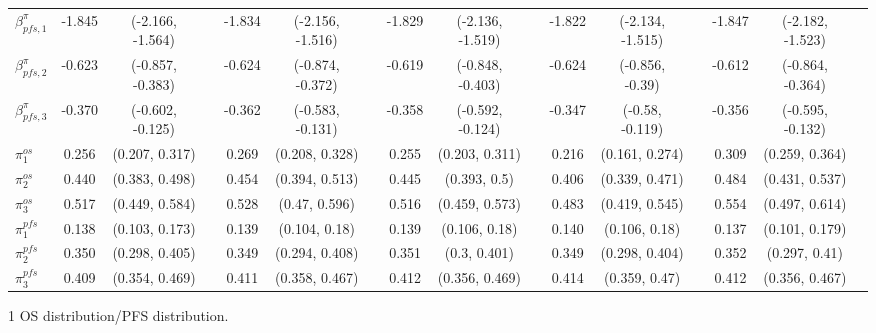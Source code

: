 \documentclass[AMA,STIX1COL]{WileyNJD-v2}
\begin{document}
\begin{landscape}
\begin{center}
\begin{table}[t]
\begin{tabular}{l c c c c c c c c c c c c c c c}
$\beta^{\pi}_{pfs, 1}$ & -1.845 & (-2.166, -1.564) &  & -1.834 & (-2.156, -1.516) &  & -1.829 & (-2.136, -1.519) &  & -1.822 & (-2.134, -1.515) &  & -1.847 & (-2.182, -1.523) & \\
$\beta^{\pi}_{pfs, 2}$ & -0.623 & (-0.857, -0.383) &  & -0.624 & (-0.874, -0.372) &  & -0.619 & (-0.848, -0.403) &  & -0.624 & (-0.856, -0.39) &  & -0.612 & (-0.864, -0.364) & \\
$\beta^{\pi}_{pfs, 3}$ & -0.370 & (-0.602, -0.125) &  & -0.362 & (-0.583, -0.131) &  & -0.358 & (-0.592, -0.124) &  & -0.347 & (-0.58, -0.119) &  & -0.356 & (-0.595, -0.132) & \\
$\pi^{os}_1$ & 0.256 & (0.207, 0.317) &  & 0.269 & (0.208, 0.328) &  & 0.255 & (0.203, 0.311) &  & 0.216 & (0.161, 0.274) &  & 0.309 & (0.259, 0.364) & \\
$\pi^{os}_2$ & 0.440 & (0.383, 0.498) &  & 0.454 & (0.394, 0.513) &  & 0.445 & (0.393, 0.5) &  & 0.406 & (0.339, 0.471) &  & 0.484 & (0.431, 0.537) & \\
$\pi^{os}_3$ & 0.517 & (0.449, 0.584) &  & 0.528 & (0.47, 0.596) &  & 0.516 & (0.459, 0.573) &  & 0.483 & (0.419, 0.545) &  & 0.554 & (0.497, 0.614) & \\
$\pi^{pfs}_1$ & 0.138 & (0.103, 0.173) &  & 0.139 & (0.104, 0.18) &  & 0.139 & (0.106, 0.18) &  & 0.140 & (0.106, 0.18) &  & 0.137 & (0.101, 0.179) & \\
$\pi^{pfs}_2$ & 0.350 & (0.298, 0.405) &  & 0.349 & (0.294, 0.408) &  & 0.351 & (0.3, 0.401) &  & 0.349 & (0.298, 0.404) &  & 0.352 & (0.297, 0.41) & \\
$\pi^{pfs}_3$ & 0.409 & (0.354, 0.469) &  & 0.411 & (0.358, 0.467) &  & 0.412 & (0.356, 0.469) &  & 0.414 & (0.359, 0.47) &  & 0.412 & (0.356, 0.467) & \\
\bottomrule
\end{tabular}
\begin{tablenotes}%
\item[1] OS distribution/PFS distribution.
\end{tablenotes}
\end{table}
\end{center}
\end{landscape}
\end{document}
